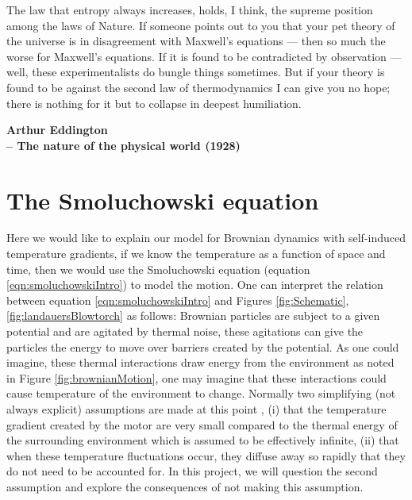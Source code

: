 \epigraph{The law that entropy always increases, holds, I think, the supreme position among the laws of Nature. If someone points out to you that your pet theory of the universe is in disagreement with Maxwell's equations — then so much the worse for Maxwell's equations. If it is found to be contradicted by observation — well, these experimentalists do bungle things sometimes. But if your theory is found to be against the second law of thermodynamics I can give you no hope; there is nothing for it but to collapse in deepest humiliation.}{\textbf{Arthur Eddington \\ -- The nature of the physical world (1928)}}


\section{The Smoluchowski equation} \label{Smoluchowski}
Here we would like to explain our model for Brownian dynamics with self-induced temperature gradients, if we know the temperature as a function of space and time, then we would use the Smoluchowski equation (equation \ref{eqn:smoluchowskiIntro}) to model the motion. One can interpret the relation between equation \ref{eqn:smoluchowskiIntro} and Figures \ref{fig:Schematic}, \ref{fig:landauersBlowtorch} as follows: Brownian particles are subject to a given potential and are agitated by thermal noise, these agitations can give the particles the energy to move over barriers created by the potential. As one could imagine, these thermal interactions draw energy from the environment as noted in Figure \ref{fig:brownianMotion}, one may imagine that these interactions could cause temperature of the environment to change. Normally two simplifying (not always explicit) assumptions are made at this point \cite{Reimann2001}, (i) that the temperature gradient created by the motor are very small compared to the thermal energy of the surrounding environment which is assumed to be effectively infinite, (ii) that when these temperature fluctuations occur, they diffuse away so rapidly that they do not need to be accounted for. In this project, we will question the second assumption and explore the consequences of not making this assumption.

